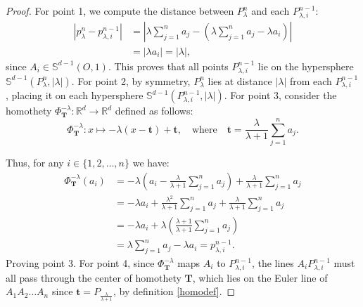 \documentclass[10pt,a4paper]{amsart}
\begin{document}
\begin{proof}
    For point 1, we compute the distance between $P_{\lambda}^n$ and each $P_{\lambda,i}^{n-1}$:
\begin{equation}
    \begin{split}
        |p_{\lambda}^n - p_{\lambda,i}^{n-1}| &= \left| \lambda \sum_{j=1}^{n} a_j - \left( \lambda \sum_{j=1}^{n} a_j - \lambda a_i \right)\right| \\
        &= |\lambda a_i| = |\lambda|,
    \end{split}
\end{equation}
    since $A_i \in \mathbb{S}^{d-1}(O,1)$. This proves that all points $P_{\lambda,i}^{n-1}$ lie on the hypersphere $\mathbb{S}^{d-1}(P_{\lambda}^n, |\lambda|)$. For point 2, by symmetry, $P_{\lambda}^n$ lies at distance $|\lambda|$ from each $P_{\lambda,i}^{n-1}$, placing it on each hypersphere $\mathbb{S}^{d-1}(P_{\lambda,i}^{n-1}, |\lambda|)$. For point 3, consider the homothety $\Phi_{\mathbf{T}}^{-\lambda} : \mathbb{R}^d \to \mathbb{R}^d$ defined as follows:
    \begin{equation}\label{homodef}
        \Phi_{\mathbf{T}}^{-\lambda}: x \mapsto -\lambda(x - \mathbf{t}) + \mathbf{t}, \quad \text{where} \quad \mathbf{t} = \frac{\lambda}{\lambda + 1} \sum_{j=1}^{n} a_j.
    \end{equation}
    
    Thus, for any $i \in \{1,2,\ldots,n\}$ we have: \begin{equation}
        \begin{split}
              \Phi^{-\lambda}_{\mathbf{T}}(a_i) &= -\lambda\left(a_i - \frac{\lambda}{\lambda + 1}\sum_{j=1}^{n}a_j\right) + \frac{\lambda}{\lambda + 1}\sum_{j=1}^{n}a_j \\
        &= -\lambda a_i + \frac{\lambda^2}{\lambda + 1}\sum_{j=1}^{n}a_j + \frac{\lambda}{\lambda + 1}\sum_{j=1}^{n}a_j \\
        &= -\lambda a_i + \lambda\left(\frac{\lambda + 1}{\lambda + 1}\sum_{j=1}^{n}a_j\right) \\
        &= \lambda\sum_{j=1}^{n}a_j - \lambda a_i = p_{\lambda,i}^{n-1}.
        \end{split}
    \end{equation}
     Proving point 3. For point 4, since $\Phi_{\mathbf{T}}^{-\lambda}$ maps $A_i$ to $P_{\lambda,i}^{n-1}$, the lines $A_iP_{\lambda,i}^{n-1}$ must all pass through the center of homothety $\mathbf{T}$, which lies on the Euler line of $A_1A_2\ldots A_n$ since $\mathbf{t}= P_{\frac{\lambda}{\lambda +1}}$, by definition \eqref{homodef}.
\end{proof}
\end{document}
